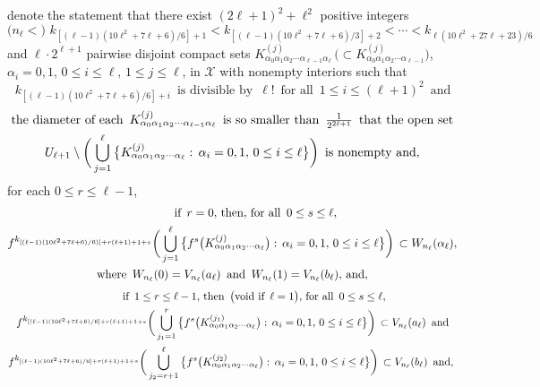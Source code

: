 \documentclass[12pt]{article}
\newcommand{\al}{\alpha}
\begin{document}
denote the statement that 
\noindent
there exist $(2\ell+1)^2+\ell^2$ positive integers 
$$
\big(n_{\ell} <\big) \,\, k_{[(\ell-1)(10\ell^2+7\ell+6)/6]+1} < k_{[(\ell-1)(10\ell^2+7\ell+6)/3]+2} < \cdots < k_{\ell(10\ell^2+27\ell+23)/6}
$$
and $\ell \cdot 2^{\ell+1}$ pairwise disjoint compact sets $K_{\al_0\al_1\al_2\cdots \al_{\ell-1}\al_\ell}^{(j)} \, \big(\subset K_{\al_0\al_1\al_2\cdots \al_{\ell-1}}^{(j)}\big)$, $\al_i = 0, 1, \, 0 \le i \le \ell, \, 1 \le j \le \ell$, in $\mathcal X$ with nonempty interiors such that
{\large 
$$
k_{[(\ell-1)(10\ell^2+7\ell+6)/6]+i} \,\,\, \text{is divisible by} \,\,\, {\ell}! \,\,\, \text{for all} \,\,\, 1 \le i \le (\ell+1)^2 \,\,\, \text{and}
$$
\begin{multline*}
$$
\text{the diameter of each} \,\,\, K_{\al_0\al_1\al_2\cdots \al_{\ell-1}\al_\ell}^{(j)} \,\,\, \text{is so smaller than} \,\,\, \frac 1{2^{2\ell+1}} \,\,\, \text{that the open set} \\ 
U_{\ell+1} \setminus \bigg( \bigcup_{j=1}^\ell \big\{ K_{\al_0\al_1\al_2\cdots\al_{\ell}}^{(j)}: \, \al_i = 0, 1, \, 0 \le i \le \ell \big\} \bigg) \,\,\, \text{is nonempty and},
$$
\end{multline*}}
for each $0 \le r \le \ell-1$, 
\begin{multline*}
$$
\qquad\qquad \text{if} \,\,\, r = 0, \, \text{then}, \, \text{for all} \,\,\, 0 \le s \le \ell,  \\
f^{k_{[(\ell-1)(10\ell^2+7\ell+6)/6)]+r(\ell+1)+1+s}}\bigg(\bigcup_{j=1}^\ell \big\{ f^s\big(K_{\al_0\al_1\al_2\cdots\al_\ell}^{(j)}\big): \, \al_i = 0, 1, \, 0 \le i \le \ell \big\}\bigg) \, \subset W_{n_\ell}(\al_\ell), \\ 
\text{where} \,\,\, W_{n_\ell}(0) = V_{n_\ell}(a_\ell) \,\,\, \text{and} \,\,\, W_{n_\ell}(1) = V_{n_\ell}(b_\ell), \, \text{and},
$$
\end{multline*}
\begin{multline*}
$$
\qquad\qquad \text{if} \,\,\, 1 \le r \le \ell-1, \, \text{then} \,\,\, \big(\text{void if} \,\,\, \ell = 1\big), \, \text{for all} \,\,\, 0 \le s \le \ell, \\
f^{k_{[(\ell-1)(10\ell^2+7\ell+6)/6]+r(\ell+1)+1+s}}\bigg(\bigcup_{j_1=1}^r \big\{ f^s\big(K_{\al_0\al_1\al_2\cdots\al_\ell}^{(j_1)}\big): \, \al_i = 0, 1, \, 0 \le i \le \ell \big\}\bigg) \, \subset V_{n_\ell}(a_\ell) \,\,\, \text{and} \\ 
f^{k_{[(\ell-1)(10\ell^2+7\ell+6)/6]+r(\ell+1)+1+s}}\bigg(\bigcup_{j_2=r+1}^\ell \big\{ f^s\big(K_{\al_0\al_1\al_2\cdots\al_\ell}^{(j_2)}\big): \, \al_i = 0, 1, \, 0 \le i \le \ell \big\}\bigg) \, \subset V_{n_\ell}(b_\ell) \,\,\,\text{and}, \,\,
$$
\end{multline*}
\end{document}
